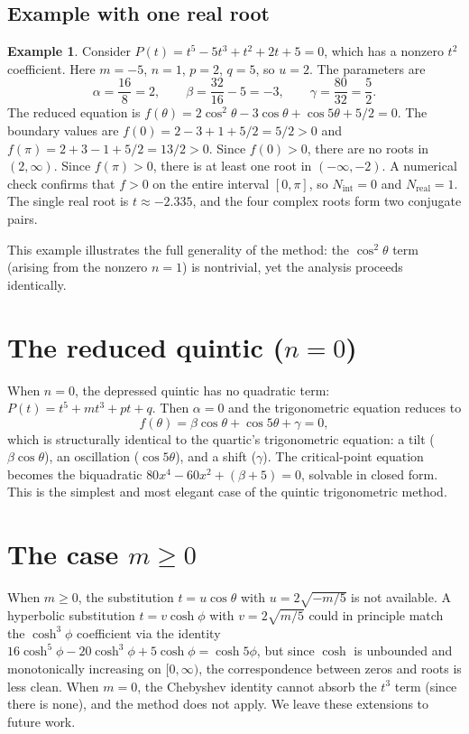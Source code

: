\documentclass[12pt]{article}
\theoremstyle{definition}
\newtheorem{example}[theorem]{Example}
\theoremstyle{remark}
\begin{document}
\subsection{Example with one real root}

\begin{example}\label{ex:one}
Consider $P(t) = t^5 - 5t^3 + t^2 + 2t + 5 = 0$, which has a nonzero $t^2$ coefficient. Here $m = -5$, $n = 1$, $p = 2$, $q = 5$, so $u = 2$. The parameters are
\[
\alpha = \frac{16}{8} = 2, \qquad \beta = \frac{32}{16} - 5 = -3, \qquad \gamma = \frac{80}{32} = \frac{5}{2}.
\]
The reduced equation is $f(\theta) = 2\cos^2\!\theta - 3\cos\theta + \cos 5\theta + 5/2 = 0$. The boundary values are $f(0) = 2 - 3 + 1 + 5/2 = 5/2 > 0$ and $f(\pi) = 2 + 3 - 1 + 5/2 = 13/2 > 0$. Since $f(0) > 0$, there are no roots in $(2, \infty)$. Since $f(\pi) > 0$, there is at least one root in $(-\infty, -2)$. A numerical check confirms that $f > 0$ on the entire interval $[0,\pi]$, so $N_{\mathrm{int}} = 0$ and $N_{\mathrm{real}} = 1$. The single real root is $t \approx -2.335$, and the four complex roots form two conjugate pairs.

This example illustrates the full generality of the method: the $\cos^2\!\theta$ term (arising from the nonzero $n = 1$) is nontrivial, yet the analysis proceeds identically.
\end{example}

\section{The reduced quintic ($n = 0$)}

When $n = 0$, the depressed quintic has no quadratic term: $P(t) = t^5 + mt^3 + pt + q$. Then $\alpha = 0$ and the trigonometric equation reduces to
\[
f(\theta) = \beta\cos\theta + \cos 5\theta + \gamma = 0,
\]
which is structurally identical to the quartic's trigonometric equation: a tilt ($\beta\cos\theta$), an oscillation ($\cos 5\theta$), and a shift ($\gamma$). The critical-point equation becomes the biquadratic $80x^4 - 60x^2 + (\beta + 5) = 0$, solvable in closed form. This is the simplest and most elegant case of the quintic trigonometric method.

\section{The case $m \geq 0$}\label{sec:mgeq0}

When $m \geq 0$, the substitution $t = u\cos\theta$ with $u = 2\sqrt{-m/5}$ is not available. A hyperbolic substitution $t = v\cosh\phi$ with $v = 2\sqrt{m/5}$ could in principle match the $\cosh^3\!\phi$ coefficient via the identity $16\cosh^5\!\phi - 20\cosh^3\!\phi + 5\cosh\phi = \cosh 5\phi$, but since $\cosh$ is unbounded and monotonically increasing on $[0,\infty)$, the correspondence between zeros and roots is less clean. When $m = 0$, the Chebyshev identity cannot absorb the $t^3$ term (since there is none), and the method does not apply. We leave these extensions to future work.
\end{document}
